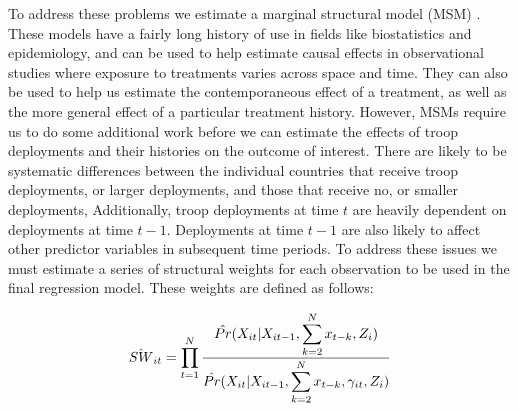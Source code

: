 To address these problems we estimate a marginal structural model (MSM) \cite{Robinsetal2000,BlackwellGlynn2018}. These models have a fairly long history of use in fields like biostatistics and epidemiology, and can be used to help estimate causal effects in observational studies where exposure to treatments varies across space and time. They can also be used to help us estimate the contemporaneous effect of a treatment, as well as the more general effect of a particular treatment history. However, MSMs require us to do some additional work before we can estimate the effects of troop deployments and their histories on the outcome of interest. There are likely to be systematic differences between the individual countries that receive troop deployments, or larger deployments, and those that receive no, or smaller deployments, Additionally, troop deployments at time $t$ are heavily dependent on deployments at time $t-1$. Deployments at time $t-1$ are also likely to affect other predictor variables in subsequent time periods. To address these issues we must estimate a series of structural weights for each observation to be used in the final regression model. These weights are defined as follows:

\begin{equation}
\hat{SW}_{it} = \prod_{t=1}^{N} {{\hat{Pr}(X_{it} | X_{it-1}, \displaystyle \sum_{k = 2}^{N} x_{t-k}  , Z_{i})}\over{\hat{Pr}(X_{it} | X_{it-1} ,  \displaystyle \sum_{k = 2}^{N} x_{t-k}, \gamma_{it} ,Z_{i})}} 
\label{eq:structuralweights}
\end{equation}


